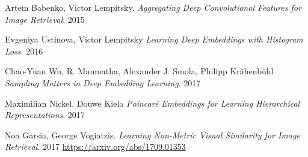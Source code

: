 \documentclass[a4paper,12pt]{extreport}
\begin{document}
    \begin{thebibliography}{9}

        Artem Babenko, Victor Lempitsky.
        \textit{Aggregating Deep Convolutional Features for Image Retrieval}.
        2015

        Evgeniya Ustinova, Victor Lempitsky
        \textit{Learning Deep Embeddings with Histogram Loss}.
        2016

        Chao-Yuan Wu, R. Manmatha, Alexander J. Smola, Philipp Krähenbühl
        \textit{Sampling Matters in Deep Embedding Learning}.
        2017

        Maximilian Nickel, Douwe Kiela
        \textit{Poincaré Embeddings for Learning Hierarchical Representations}.
        2017

        Noa Garsia, George Vogiatzis.
        \textit{Learning Non-Metric Visual Similarity for Image Retrieval}.
        2017
        \url{https://arxiv.org/abs/1709.01353}

    \end{thebibliography}
\end{document}
